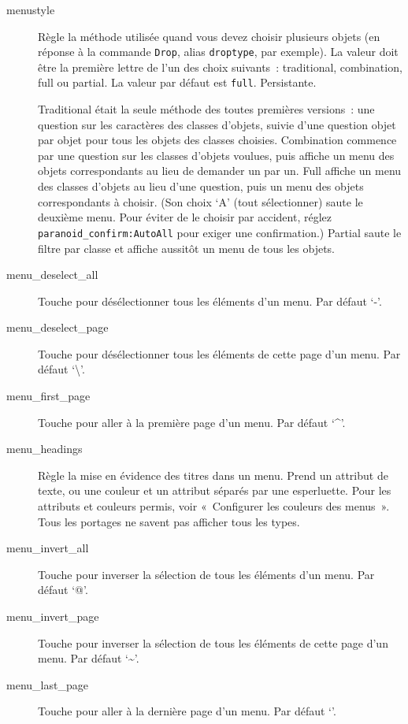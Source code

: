 \documentclass[titlepage]{article}
\begin{document}
\begin{description}
\item[{menustyle}]
Règle la méthode utilisée quand vous devez choisir plusieurs objets (en
réponse à la commande \texttt{Drop}, alias \texttt{droptype}, par exemple).
La valeur doit être la première lettre de l'un des choix suivants~:
traditional, combination, full ou partial.
La valeur par défaut est \texttt{full}.
Persistante.


Traditional était la seule méthode des toutes premières versions~: une
question sur les caractères des classes d'objets, suivie d'une question
objet par objet pour tous les objets des classes choisies.
Combination commence par une question sur les classes d'objets voulues,
puis affiche un menu des objets correspondants au lieu de demander un par
un.
Full affiche un menu des classes d'objets au lieu d'une question, puis un
menu des objets correspondants à choisir.
(Son choix `A' (tout sélectionner) saute le deuxième menu.
Pour éviter de le choisir par accident, réglez
\texttt{paranoid\_confirm:AutoAll} pour exiger une confirmation.)
Partial saute le filtre par classe et affiche aussitôt un menu de tous les
objets.

\item[{menu\_deselect\_all}]
Touche pour désélectionner tous les éléments d'un menu.
Par défaut `-'.

\item[{menu\_deselect\_page}]
Touche pour désélectionner tous les éléments de cette page d'un menu.
Par défaut `\textbackslash{}'.

\item[{menu\_first\_page}]
Touche pour aller à la première page d'un menu.
Par défaut `\textasciicircum{}'.

\item[{menu\_headings}]
Règle la mise en évidence des titres dans un menu.
Prend un attribut de texte, ou une couleur et un attribut séparés par une
esperluette.
Pour les attributs et couleurs permis, voir «~Configurer les couleurs
des menus~».
Tous les portages ne savent pas afficher tous les types.

\item[{menu\_invert\_all}]
Touche pour inverser la sélection de tous les éléments d'un menu.
Par défaut `@'.

\item[{menu\_invert\_page}]
Touche pour inverser la sélection de tous les éléments de cette page d'un
menu.
Par défaut `\textasciitilde{}'. 

\item[{menu\_last\_page}]
Touche pour aller à la dernière page d'un menu.
Par défaut `\textbar{}'.


\end{description}
\end{document}
